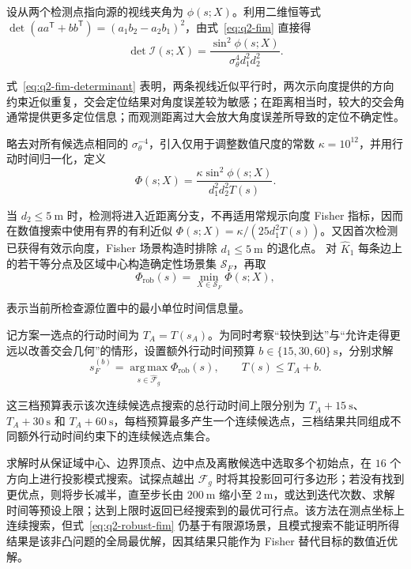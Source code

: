 \documentclass[withoutpreface,bwprint]{cumcmthesis}
\begin{document}
设从两个检测点指向源的视线夹角为 $\phi(s;X)$。利用二维恒等式 $\det(aa^{\mathsf T}+bb^{\mathsf T})=(a_1b_2-a_2b_1)^2$，由式~\eqref{eq:q2-fim} 直接得
\begin{equation}
  \det\mathcal I(s;X)
  =\frac{\sin^2\phi(s;X)}
  {\sigma_\theta^4d_1^2d_2^2}.
  \label{eq:q2-fim-determinant}
\end{equation}

式~\eqref{eq:q2-fim-determinant} 表明，两条视线近似平行时，两次示向度提供的方向约束近似重复，交会定位结果对角度误差较为敏感；在距离相当时，较大的交会角通常提供更多定位信息；而观测距离过大会放大角度误差所导致的定位不确定性。

略去对所有候选点相同的 $\sigma_\theta^{-4}$，引入仅用于调整数值尺度的常数 $\kappa=10^{12}$，并用行动时间归一化，定义
\begin{equation}
  \Phi(s;X)=
  \frac{\kappa\sin^2\phi(s;X)}
  {d_1^2d_2^2T(s)}.
\end{equation}

当 $d_2\leq5\ \mathrm{m}$ 时，检测将进入近距离分支，不再适用常规示向度 Fisher 指标，因而在数值搜索中使用有界的有利近似 $\Phi(s;X)=\kappa/(25d_1^2T(s))$。又因首次检测已获得有效示向度，Fisher 场景构造时排除 $d_1\leq5\ \mathrm{m}$ 的退化点。
对 $\widehat K_1$ 每条边上的若干等分点及区域中心构造确定性场景集 $\mathcal S_F$，再取
\begin{equation}
  \Phi_{\mathrm{rob}}(s)
  =\min_{X\in\mathcal S_F}\Phi(s;X),
  \label{eq:q2-robust-fim}
\end{equation}

表示当前所检查源位置中的最小单位时间信息量。

记方案一选点的行动时间为 $T_A=T(s_A)$。为同时考察“较快到达”与“允许走得更远以改善交会几何”的情形，设置额外行动时间预算 $b\in\{15,30,60\}\ \mathrm{s}$，分别求解
\begin{equation}
  s_F^{(b)}
  =\operatorname*{arg\,max}_{s\in\widehat{\mathcal F}_g}
  \Phi_{\mathrm{rob}}(s),
  \qquad T(s)\leq T_A+b.
  \label{eq:q2-fim-budget}
\end{equation}

这三档预算表示该次连续候选点搜索的总行动时间上限分别为 $T_A+15\ \mathrm{s}$、$T_A+30\ \mathrm{s}$ 和 $T_A+60\ \mathrm{s}$，每档预算最多产生一个连续候选点，三档结果共同组成不同额外行动时间约束下的连续候选点集合。

求解时从保证域中心、边界顶点、边中点及离散候选中选取多个初始点，在 $16$ 个方向上进行投影模式搜索。试探点越出 $\widehat{\mathcal F}_g$ 时将其投影回可行多边形；若没有找到更优点，则将步长减半，直至步长由 $200\ \mathrm{m}$ 缩小至 $2\ \mathrm{m}$，或达到迭代次数、求解时间等预设上限；达到上限时返回已经搜索到的最优可行点。该方法在测点坐标上连续搜索，但式~\eqref{eq:q2-robust-fim} 仍基于有限源场景，且模式搜索不能证明所得结果是该非凸问题的全局最优解，因其结果只能作为 Fisher 替代目标的数值近优解。
\end{document}
